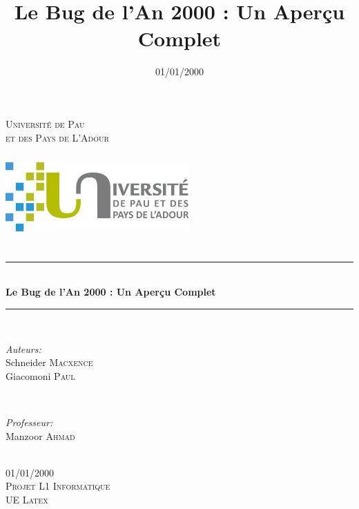 \documentclass[12pt,a4paper]{article}
\date{01/01/2000}
\title{Le Bug de l'An 2000 : Un Aperçu Complet}
\begin{document}
\begin{titlepage}

\newcommand{\HRule}{\rule{\linewidth}{0.5mm}} 
\center 

\textsc{\LARGE Université de Pau \\ et des Pays de L'Adour}\\[1.5cm] 
\includegraphics[width=7cm, height=4cm]{./images/uppa.png}\\




\HRule \\[0.4cm]
{ \huge \bfseries Le Bug de l'An 2000 : Un Aperçu Complet }\\[0.4cm] 
\HRule \\[1.5cm]


\begin{minipage}{0.4\textwidth}
\begin{flushleft} \large
\emph{Auteurs:}\\
Schneider \textsc{Macxence}\\ 
Giacomoni \textsc{Paul}
\end{flushleft}
\end{minipage}
~
\begin{minipage}{0.4\textwidth}
\begin{flushright} \large
\emph{Professeur:} \\
Manzoor \textsc{Ahmad}
\end{flushright}
\end{minipage}\\[2cm]


01/01/2000\\[1cm]

\textsc{\Large Projet L1 Informatique}\\[0.5cm] 
\textsc{\large UE Latex}\\[0.5cm] 

 

\end{titlepage}


\newpage


\begin{center}
\tableofcontents
\end{center}
\end{document}
